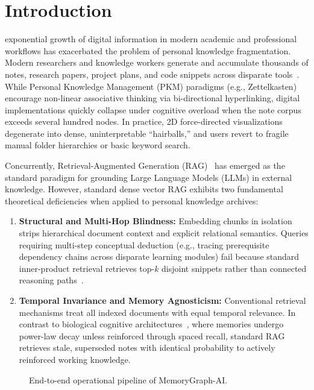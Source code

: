 \section{Introduction}
\label{sec:intro}

 exponential growth of digital information in modern academic and professional workflows has exacerbated the problem of personal knowledge fragmentation. Modern researchers and knowledge workers generate and accumulate thousands of notes, research papers, project plans, and code snippets across disparate tools~\cite{bush1945think, ahrens2017smartnotes}. While Personal Knowledge Management (PKM) paradigms (e.g., Zettelkasten) encourage non-linear associative thinking via bi-directional hyperlinking, digital implementations quickly collapse under cognitive overload when the note corpus exceeds several hundred nodes. In practice, 2D force-directed visualizations degenerate into dense, uninterpretable ``hairballs,'' and users revert to fragile manual folder hierarchies or basic keyword search.

Concurrently, Retrieval-Augmented Generation (RAG)~\cite{lewis2020rag, karpukhin2020dpr} has emerged as the standard paradigm for grounding Large Language Models (LLMs) in external knowledge. However, standard dense vector RAG exhibits two fundamental theoretical deficiencies when applied to personal knowledge archives:
\begin{enumerate}
    \item \textbf{Structural and Multi-Hop Blindness:} Embedding chunks in isolation strips hierarchical document context and explicit relational semantics. Queries requiring multi-step conceptual deduction (e.g., tracing prerequisite dependency chains across disparate learning modules) fail because standard inner-product retrieval retrieves top-$k$ disjoint snippets rather than connected reasoning paths~\cite{edge2024graphrag, gutierrez2024hipporag}.
    \item \textbf{Temporal Invariance and Memory Agnosticism:} Conventional retrieval mechanisms treat all indexed documents with equal temporal relevance. In contrast to biological cognitive architectures~\cite{anderson2004actr, ebbinghaus1885memory}, where memories undergo power-law decay unless reinforced through spaced recall, standard RAG retrieves stale, superseded notes with identical probability to actively reinforced working knowledge.
\end{enumerate}

\begin{figure}[t]
\centering
{}
\caption{End-to-end operational pipeline of MemoryGraph-AI.}
\label{fig:overview}
\end{figure}

